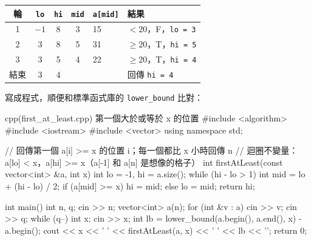 \begin{center}
\begin{tabular}{ccccll}
\toprule
輪 & \texttt{lo} & \texttt{hi} & \texttt{mid} & \texttt{a[mid]} & 結果 \\
\midrule
1 & $-1$ & 8 & 3 & 15 & $< 20$，F，\texttt{lo = 3} \\
2 & 3 & 8 & 5 & 31 & $\ge 20$，T，\texttt{hi = 5} \\
3 & 3 & 5 & 4 & 22 & $\ge 20$，T，\texttt{hi = 4} \\
\midrule
結束 & 3 & 4 & & & 回傳 \texttt{hi = 4} \\
\bottomrule
\end{tabular}
\end{center}

寫成程式，順便和標準函式庫的 \texttt{lower\_bound} 比對：

\begin{example}[label=ex:first-at-least]{cpp}{(first\_at\_least.cpp) 第一個大於或等於 x 的位置}
#include <algorithm>
#include <iostream>
#include <vector>
using namespace std;

// 回傳第一個 a[i] >= x 的位置 i；每一個都比 x 小時回傳 n
// 迴圈不變量：a[lo] < x，a[hi] >= x（a[-1] 和 a[n] 是想像的格子）
int firstAtLeast(const vector<int> &a, int x) {
    int lo = -1, hi = a.size();
    while (hi - lo > 1) {
        int mid = lo + (hi - lo) / 2;
        if (a[mid] >= x) {
            hi = mid;
        } else {
            lo = mid;
        }
    }
    return hi;
}

int main() {
    int n, q;
    cin >> n;
    vector<int> a(n);
    for (int &v : a) {
        cin >> v;
    }
    cin >> q;
    while (q--) {
        int x;
        cin >> x;
        int lb = lower_bound(a.begin(), a.end(), x) - a.begin();
        cout << x << ' ' << firstAtLeast(a, x) << ' ' << lb << '\n';
    }
    return 0;
}
\end{example}


